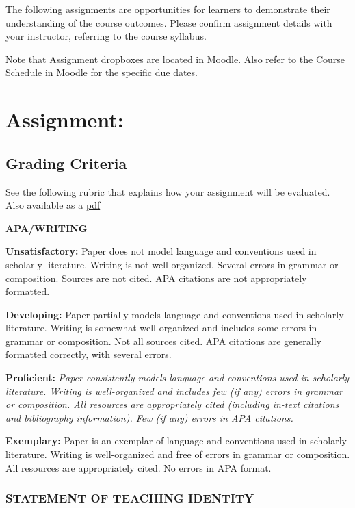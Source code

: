 \documentclass[
]{book}
\begin{document}
The following assignments are opportunities for learners to demonstrate their understanding of the course outcomes. Please confirm assignment details with your instructor, referring to the course syllabus.

Note that Assignment dropboxes are located in Moodle. Also refer to the Course Schedule in Moodle for the specific due dates.

\hypertarget{assignment}{%
\section*{Assignment:}\label{assignment}}

\hypertarget{grading-criteria}{%
\subsection*{Grading Criteria}\label{grading-criteria}}

See the following rubric that explains how your assignment will be evaluated. Also available as a \href{assets/assessment/Identity-as-a-Teacher-RUBRIC.pdf}{pdf}

\textbf{APA/WRITING}

\textbf{Unsatisfactory:} Paper does not model language and conventions used in scholarly literature. Writing is not well-organized. Several errors in grammar or composition. Sources are not cited. APA citations are not appropriately formatted.

\textbf{Developing:} Paper partially models language and conventions used in scholarly literature. Writing is somewhat well organized and includes some errors in grammar or composition. Not all sources cited. APA citations are generally formatted correctly, with several errors.

\textbf{Proficient:} \emph{Paper consistently models language and conventions used in scholarly literature. Writing is well-organized and includes few (if any) errors in grammar or composition. All resources are appropriately cited (including in-text citations and bibliography information). Few (if any) errors in APA citations.}

\textbf{Exemplary:} Paper is an exemplar of language and conventions used in scholarly literature. Writing is well-organized and free of errors in grammar or composition. All resources are appropriately cited. No errors in APA format.

\hypertarget{statement-of-teaching-identity}{%
\subsubsection*{STATEMENT OF TEACHING IDENTITY}\label{statement-of-teaching-identity}}
\end{document}
